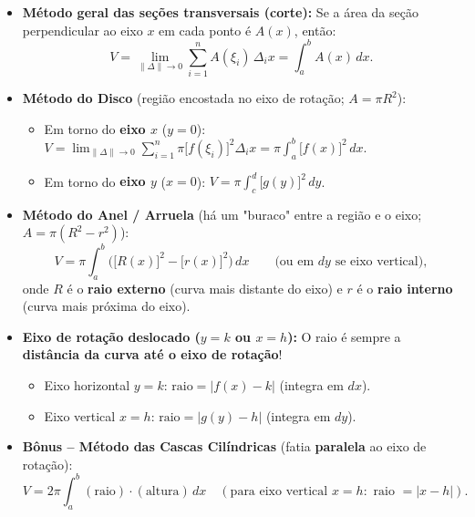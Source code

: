 \documentclass[10pt,a4paper]{article}
\begin{document}
\begin{teo}
    \begin{itemize}
        \item \textbf{Método geral das seções transversais (corte):} Se a área da seção perpendicular ao eixo $x$ em cada ponto é $A(x)$, então:
              \[
                  V = \lim_{\|\Delta\| \to 0} \sum_{i=1}^{n} A(\xi_i)\,\Delta_i x = \int_{a}^{b} A(x)\,dx.
              \]
        \item \textbf{Método do Disco} (região encostada no eixo de rotação; $A = \pi R^2$):
              \begin{itemize}
                  \item Em torno do \textbf{eixo $x$} ($y=0$): $\displaystyle V = \lim_{\|\Delta\| \to 0} \sum_{i=1}^{n} \pi \big[f(\xi_i)\big]^2 \Delta_i x = \pi \int_{a}^{b} \big[f(x)\big]^2 \, dx$.
                  \item Em torno do \textbf{eixo $y$} ($x=0$): $\displaystyle V = \pi \int_{c}^{d} \big[g(y)\big]^2 \, dy$.
              \end{itemize}
        \item \textbf{Método do Anel / Arruela} (há um "buraco" entre a região e o eixo; $A = \pi (R^2 - r^2)$):
              \[
                  V = \pi \int_{a}^{b} \Big( \big[R(x)\big]^2 - \big[r(x)\big]^2 \Big)\,dx \qquad \text{(ou em } dy \text{ se eixo vertical)},
              \]
              onde $R$ é o \textbf{raio externo} (curva mais distante do eixo) e $r$ é o \textbf{raio interno} (curva mais próxima do eixo).
        \item \textbf{Eixo de rotação deslocado ($y = k$ ou $x = h$):}
              O raio é sempre a \textbf{distância da curva até o eixo de rotação}!
              \begin{itemize}
                  \item Eixo horizontal $y = k$: $\text{raio} = |f(x) - k|$ (integra em $dx$).
                  \item Eixo vertical $x = h$: $\text{raio} = |g(y) - h|$ (integra em $dy$).
              \end{itemize}
        \item \textbf{Bônus -- Método das Cascas Cilíndricas} (fatia \textbf{paralela} ao eixo de rotação):
              \[
                  V = 2\pi \int_{a}^{b} (\text{raio}) \cdot (\text{altura}) \, dx \quad (\text{para eixo vertical } x=h: \text{ raio } = |x-h|).
              \]
    \end{itemize}
\end{teo}
\end{document}
